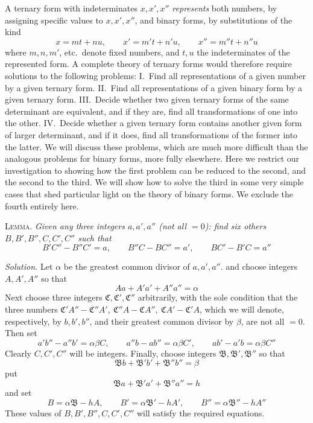 A ternary form with indeterminates $x,x',x''$ \textit{represents} both numbers, by assigning specific values to $x,x',x''$, and binary forms, by substitutions of the kind
\[
x=mt+nu,\qquad x'=m't+n'u,\qquad x''=m''t+n''u
\]
where $m,n,m'$, etc.\ denote fixed numbers, and $t,u$ the indeterminates of the represented form. A complete theory of ternary forms would therefore require solutions to the following problems: I.\ Find all representations of a given number by a given ternary form. II.\ Find all representations of a given binary form by a given ternary form. III.\ Decide whether two given ternary forms of the same determinant are equivalent, and if they are, find all transformations of one into the other. IV.\ Decide whether a given ternary form contains another given form of larger determinant, and if it does, find all transformations of the former into the latter. We will discuss these problems, which are much more difficult than the analogous problems for binary forms, more fully elsewhere. Here we restrict our investigation to showing how the first problem can be reduced to the second, and the second to the third. We will show how to solve the third in some very simple cases that shed particular light on the theory of binary forms. We exclude the fourth entirely here.

\textsc{Lemma.} \textit{Given any three integers $a,a',a''$ (not all $=0$): find six others $B,B',B'',C,C',C''$ such that}
\[
B'C''-B''C'=a,\qquad B''C-BC''=a',\qquad BC'-B'C=a''
\]

\textit{Solution.} Let $\alpha$ be the greatest common divisor of $a,a',a''$. and choose integers $A,A',A''$ so that
\[
Aa+A'a'+A''a''=\alpha
\]
Next choose three integers $\mathfrak{C},\allowbreak \mathfrak{C}',\allowbreak \mathfrak{C}''$ arbitrarily, with the sole condition that the three numbers
$\mathfrak{C}'A''-\mathfrak{C}''A',\allowbreak \ \mathfrak{C}''A-\mathfrak{C}A'',\allowbreak \
\mathfrak{C}A'-\mathfrak{C}'A$, which we will denote, respectively, by $b,b',b''$, and their greatest common divisor by $\beta$, are not all $=0$. Then set
\[
a'b''-a''b'=\alpha\beta C,\qquad
a''b-ab''=\alpha\beta C',\qquad
ab'-a'b=\alpha\beta C''
\]
Clearly $C,C',C''$ will be integers. Finally, choose integers
$\mathfrak{B},\allowbreak \mathfrak{B}',\allowbreak \mathfrak{B}''$ so that
\[
\mathfrak{B}b+\mathfrak{B}'b'+\mathfrak{B}''b''=\beta
\]
put
\[
\mathfrak{B}a+\mathfrak{B}'a'+\mathfrak{B}''a''=h
\]
and set
\[
B=\alpha\mathfrak{B}-hA,\qquad
B'=\alpha\mathfrak{B}'-hA',\qquad
B''=\alpha\mathfrak{B}''-hA''
\]
These values of $B,B',B'',C,C',C''$ will satisfy the required equations.

